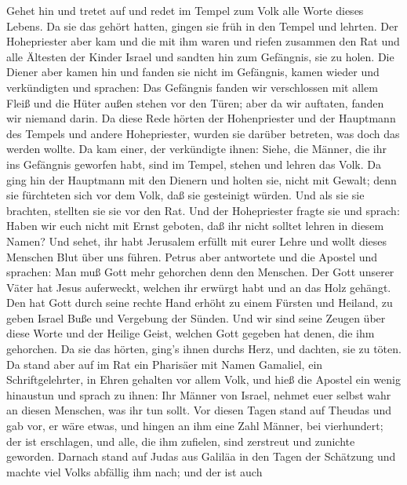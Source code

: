  Gehet hin und tretet auf und redet im Tempel zum Volk alle
Worte dieses Lebens.  Da sie das gehört hatten, gingen sie
früh in den Tempel und lehrten. Der Hohepriester aber kam und die mit
ihm waren und riefen zusammen den Rat und alle Ältesten der Kinder
Israel und sandten hin zum Gefängnis, sie zu holen.  Die
Diener aber kamen hin und fanden sie nicht im Gefängnis, kamen wieder
und verkündigten  und sprachen: Das Gefängnis fanden wir
verschlossen mit allem Fleiß und die Hüter außen stehen vor den Türen;
aber da wir auftaten, fanden wir niemand darin.  Da diese
Rede hörten der Hohenpriester und der Hauptmann des Tempels und andere
Hohepriester, wurden sie darüber betreten, was doch das werden wollte.
 Da kam einer, der verkündigte ihnen: Siehe, die Männer,
die ihr ins Gefängnis geworfen habt, sind im Tempel, stehen und lehren
das Volk.  Da ging hin der Hauptmann mit den Dienern und
holten sie, nicht mit Gewalt; denn sie fürchteten sich vor dem Volk, daß
sie gesteinigt würden.  Und als sie sie brachten, stellten
sie sie vor den Rat. Und der Hohepriester fragte sie  und
sprach: Haben wir euch nicht mit Ernst geboten, daß ihr nicht solltet
lehren in diesem Namen? Und sehet, ihr habt Jerusalem erfüllt mit eurer
Lehre und wollt dieses Menschen Blut über uns führen. 
Petrus aber antwortete und die Apostel und sprachen: Man muß Gott mehr
gehorchen denn den Menschen.  Der Gott unserer Väter hat
Jesus auferweckt, welchen ihr erwürgt habt und an das Holz gehängt.
 Den hat Gott durch seine rechte Hand erhöht zu einem
Fürsten und Heiland, zu geben Israel Buße und Vergebung der Sünden.
 Und wir sind seine Zeugen über diese Worte und der Heilige
Geist, welchen Gott gegeben hat denen, die ihm gehorchen. 
Da sie das hörten, ging's ihnen durchs Herz, und dachten, sie zu töten.
 Da stand aber auf im Rat ein Pharisäer mit Namen Gamaliel,
ein Schriftgelehrter, in Ehren gehalten vor allem Volk, und hieß die
Apostel ein wenig hinaustun  und sprach zu ihnen: Ihr
Männer von Israel, nehmet euer selbst wahr an diesen Menschen, was ihr
tun sollt.  Vor diesen Tagen stand auf Theudas und gab vor,
er wäre etwas, und hingen an ihm eine Zahl Männer, bei vierhundert; der
ist erschlagen, und alle, die ihm zufielen, sind zerstreut und zunichte
geworden.  Darnach stand auf Judas aus Galiläa in den Tagen
der Schätzung und machte viel Volks abfällig ihm nach; und der ist auch
